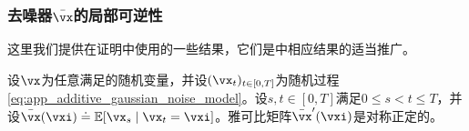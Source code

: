 \documentclass[../../book-main.tex]{subfiles}
\begin{document}
\subsubsection{去噪器\(\bar{\vx}\)的局部可逆性}

这里我们提供在证明中使用的一些结果，它们是\cite{Gribonval2011-pf}中相应结果的适当推广。

\begin{lemma}\label{lem:gribonval_A1}
    设\(\vx\)为任意满足的随机变量，并设\((\vx_{t})_{t \in [0, T]}\)为随机过程\eqref{eq:app_additive_gaussian_noise_model}。设\(s, t \in [0, T]\)满足\(0 \leq s < t \leq T\)，并设\(\bar{\vx}(\vxi) \doteq \Ex[\vx_{s} \mid \vx_{t} = \vxi]\)。雅可比矩阵\(\bar{\vx}^{\prime}(\vxi)\)是对称正定的。
\end{lemma}
\end{document}
